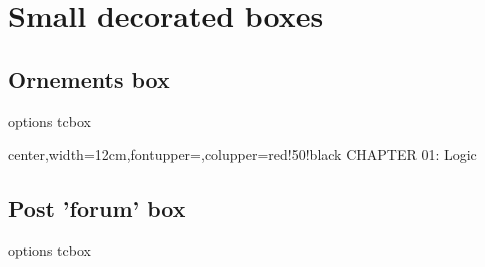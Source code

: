 \documentclass[english,11pt,a4paper]{article}
\begin{document}
\section{Small decorated boxes}

\subsection{Ornements box}

\begin{codehigh}[language=latex/latex2]
\begin{tcboxornaments}[keys]{options tcbox}
\end{tcboxornaments}

\end{codehigh}

\begin{demohigh}[language=latex/latex2,style/main=teal!25,style/code=teal!25]
\begin{tcboxornaments}{}
\lipsum[1][1-5]
\end{tcboxornaments}
\end{demohigh}

\begin{demohigh}[language=latex/latex2,style/main=teal!25,style/code=teal!25]
\begin{tcboxornaments}
  [color deco=red!50!black,h size deco=3cm]
  {center,width=12cm,fontupper=\LARGE\sffamily,colupper=red!50!black}
CHAPTER 01: Logic
\end{tcboxornaments}
\end{demohigh}

\pagebreak

\subsection{Post 'forum' box}

\begin{codehigh}[language=latex/latex2]
\begin{tcforumpost}[keys]{options tcbox}
\end{tcforumpost}

\end{codehigh}
\end{document}
